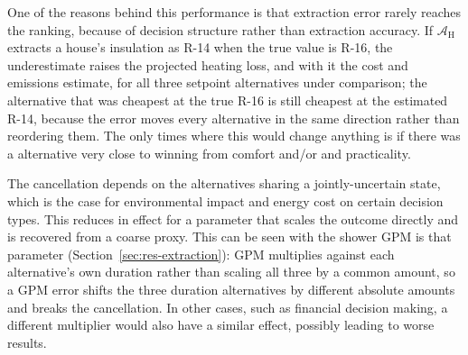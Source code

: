 \documentclass[final,3p,times]{elsarticle}
\begin{document}
One of the reasons behind this performance is that extraction error rarely reaches the ranking, because of decision structure rather than extraction accuracy. If $\mathcal{A}_{\text{H}}$ extracts a house's insulation as R-14 when the true value is R-16, the underestimate raises the projected heating loss, and with it the cost and emissions estimate, for all three setpoint alternatives under comparison; the alternative that was cheapest at the true R-16 is still cheapest at the estimated R-14, because the error moves every alternative in the same direction rather than reordering them. The only times where this would change anything is if there was a alternative very close to winning from comfort and/or and practicality.

The cancellation depends on the alternatives sharing a jointly-uncertain state, which is the case for environmental impact and energy cost on certain decision types. This reduces in effect for a parameter that scales the outcome directly and is recovered from a coarse proxy. This can be seen with the shower GPM is that parameter (Section~\ref{sec:res-extraction}): GPM multiplies against each alternative's own duration rather than scaling all three by a common amount, so a GPM error shifts the three duration alternatives by different absolute amounts and breaks the cancellation. In other cases, such as financial decision making, a different multiplier would also have a similar effect, possibly leading to worse results.
\end{document}
